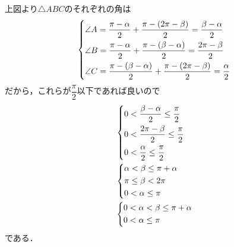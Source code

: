 \documentclass[../../main.tex]{subfiles}
\begin{document}
上図より$\triangle ABC$のそれぞれの角は
\begin{align}
  \begin{dcases}
    \angle A = \dfrac{\pi-\alpha}{2} + \dfrac{\pi-(2\pi-\beta)}{2} = \dfrac{\beta-\alpha}{2} \\
    \angle B = \dfrac{\pi-\alpha}{2} + \dfrac{\pi-(\beta-\alpha)}{2} = \dfrac{2\pi-\beta}{2} \\
    \angle C = \dfrac{\pi-(\beta-\alpha)}{2} + \dfrac{\pi-(2\pi-\beta)}{2} = \dfrac{\alpha}{2}
  \end{dcases}
\end{align}
だから，これらが$\dfrac{\pi}{2}$以下であれば良いので
\begin{align}
  &
  \begin{dcases}
    0 < \dfrac{\beta-\alpha}{2} \le \dfrac{\pi}{2} \\
    0 < \dfrac{2\pi-\beta}{2} \le \dfrac{\pi}{2} \\
    0 < \dfrac{\alpha}{2} \le \dfrac{\pi}{2}
  \end{dcases} \\
  &
  \begin{dcases}
    \alpha < \beta \le \pi+\alpha \\
    \pi \le \beta < 2\pi \\
    0 < \alpha \le \pi
  \end{dcases} \\
  &
  \begin{dcases}
    0 < \alpha < \beta \le \pi+\alpha \\
    0 < \alpha \le \pi
  \end{dcases} \label{eq:2}
\end{align}
である．
\end{document}
